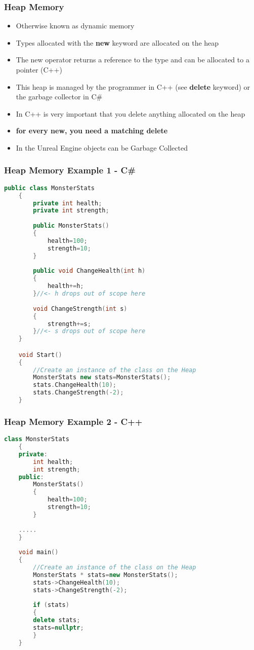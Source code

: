 \begin{frame}
\frametitle{Heap Memory}
\begin{itemize}
\item Otherwise known as dynamic memory
\item Types allocated with the \textbf{new} keyword are allocated on the heap
\item The new operator returns a reference to the type and can be allocated to a pointer (C++)
\item This heap is managed by the programmer in C++ (see \textbf{delete} keyword) or the garbage collector in C\#
\item In C++ is very important that you delete anything allocated on the heap
\item \textbf{for every new, you need a matching delete}
\item In the Unreal Engine objects can be Garbage Collected
\end{itemize}
\end{frame}

\begin{frame}[fragile]
\frametitle{Heap Memory Example 1 - C\#}
\begin{lstlisting}[language=C++,basicstyle=\tiny,]
	public class MonsterStats
	{
		private int health;
		private int strength;
		
		public MonsterStats()
		{
			health=100;
			strength=10;
		}
	
		public void ChangeHealth(int h)
		{
			health+=h;
		}//<- h drops out of scope here
	
		void ChangeStrength(int s)
		{
			strength+=s;
		}//<- s drops out of scope here
	}

	void Start()
	{		
		//Create an instance of the class on the Heap
		MonsterStats new stats=MonsterStats();
		stats.ChangeHealth(10);
		stats.ChangeStrength(-2);
	}	
\end{lstlisting}
\end{frame}

\begin{frame}[fragile]
\frametitle{Heap Memory Example 2 - C++}
\begin{lstlisting}[language=C++,basicstyle=\tiny,]
	class MonsterStats
	{
	private:
		int health;
		int strength;
	public:
		MonsterStats()
		{
			health=100;
			strength=10;
		}
		
	.....
	}
	
	void main()
	{		
		//Create an instance of the class on the Heap
		MonsterStats * stats=new MonsterStats();
		stats->ChangeHealth(10);
		stats->ChangeStrength(-2);
	
		if (stats)
		{
		delete stats;
		stats=nullptr;
		}
	}
\end{lstlisting}
\end{frame}

